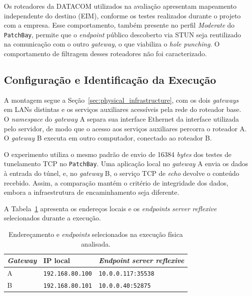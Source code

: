 Os roteadores da DATACOM utilizados na avaliação apresentam mapeamento independente do destino (EIM), conforme os testes realizados durante o projeto com a empresa. Esse comportamento, também presente no perfil \textit{Moderate} do \texttt{PatchBay}, permite que o \textit{endpoint} público descoberto via STUN seja reutilizado na comunicação com o outro \textit{gateway}, o que viabiliza o \textit{hole punching}. O comportamento de filtragem desses roteadores não foi caracterizado.

\subsection{Configuração e Identificação da Execução}

A montagem segue a Seção~\ref{sec:physical_infrastructure}, com os dois \textit{gateways} em LANs distintas e os serviços auxiliares acessíveis pela rede do roteador base. O \textit{namespace} do \textit{gateway} A separa sua interface Ethernet da interface utilizada pelo servidor, de modo que o acesso aos serviços auxiliares percorra o roteador A. O \textit{gateway} B executa em outro computador, conectado ao roteador B.

O experimento utiliza o mesmo padrão de envio de 16384 \textit{bytes} dos testes de tunelamento TCP no \texttt{PatchBay}. Uma aplicação local no \textit{gateway} A envia os dados à entrada do túnel, e, no \textit{gateway} B, o serviço TCP de \textit{echo} devolve o conteúdo recebido. Assim, a comparação mantém o critério de integridade dos dados, embora a infraestrutura de encaminhamento seja diferente.

A Tabela~\ref{tab:physical_selected_endpoints} apresenta os endereços locais e os \textit{endpoints} \textit{server reflexive} selecionados durante a execução.

\begin{table}[htbp]
    \centering
    \caption{Endereçamento e \textit{endpoints} selecionados na execução física analisada.}
    \label{tab:physical_selected_endpoints}
    \begin{tabular}{@{}p{}p{}p{}@{}}
        \toprule
        \textbf{\textit{Gateway}} & \textbf{IP local} & \textbf{\textit{Endpoint} \textit{server reflexive}} \\
        \midrule
        A & \texttt{192.168.80.100} & \texttt{10.0.0.117:35538} \\
        B & \texttt{192.168.80.101} & \texttt{10.0.0.40:52875} \\
        \bottomrule
    \end{tabular}
\end{table}


